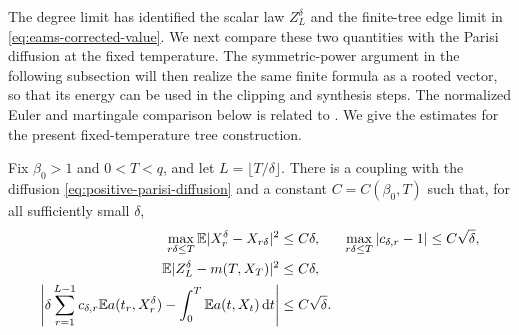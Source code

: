 The degree limit has identified the scalar law $Z^\delta_L$ and the
finite-tree edge limit in \eqref{eq:eams-corrected-value}.  We next
compare these two quantities with the Parisi diffusion at the fixed
temperature.  The symmetric-power argument in the following subsection
will then realize the same finite formula as a rooted vector, so that
its energy can be used in the clipping and synthesis steps.
The normalized Euler and martingale comparison below is related to
\cite[Proposition~5.3]{AMS2020}. We give the estimates for the present
fixed-temperature tree construction.

\begin{lemma}
\label{lem:eams-positive-continuum}
Fix $\beta_0>1$ and $0<T<q$, and let $L=\lfloor T/\delta\rfloor$.
There is a coupling with the diffusion
\eqref{eq:positive-parisi-diffusion} and a constant $C=C(\beta_0,T)$
such that, for all sufficiently small $\delta$,
\begin{align}
 \max_{r\delta\le T}\mathbb E|X^\delta_r-X_{r\delta}|^2&\le C\delta,
 &\max_{r\delta\le T}|c_{\delta,r}-1|&\le C\sqrt\delta,
 \label{eq:euler-normalization-bound}\\
 \mathbb E|Z^\delta_L-m(T,X_T)|^2&\le C\delta,
 \label{eq:martingale-euler-bound}\\
 \left|\delta\sum_{r=1}^{L-1}c_{\delta,r}\mathbb E a(t_r,X^\delta_r)
                    -\int_0^T\mathbb E a(t,X_t)\,\mathrm d t\right|
    &\le C\sqrt\delta.
 \label{eq:value-riemann-bound}
\end{align}
\end{lemma}

